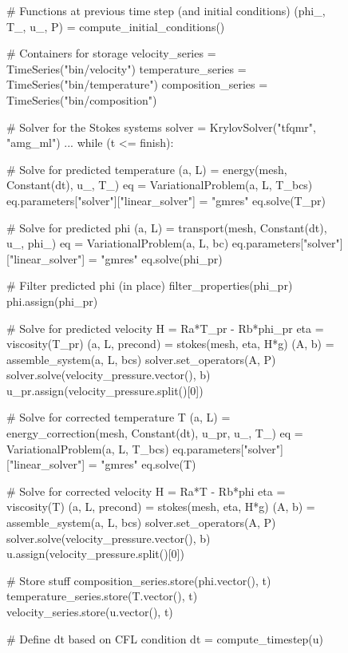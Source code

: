 \begin{figure}
    \begin{python}
# Functions at previous time step (and initial conditions)
(phi_, T_, u_, P) = compute_initial_conditions()

# Containers for storage
velocity_series = TimeSeries("bin/velocity")
temperature_series = TimeSeries("bin/temperature")
composition_series = TimeSeries("bin/composition")

# Solver for the Stokes systems
solver = KrylovSolver("tfqmr", "amg_ml")
...
while (t <= finish):

    # Solve for predicted temperature
    (a, L) = energy(mesh, Constant(dt), u_, T_)
    eq = VariationalProblem(a, L, T_bcs)
    eq.parameters["solver"]["linear_solver"] = "gmres"
    eq.solve(T_pr)

    # Solve for predicted phi
    (a, L) = transport(mesh, Constant(dt), u_, phi_)
    eq = VariationalProblem(a, L, bc)
    eq.parameters["solver"]["linear_solver"] = "gmres"
    eq.solve(phi_pr)

    # Filter predicted phi (in place)
    filter_properties(phi_pr)
    phi.assign(phi_pr)

    # Solve for predicted velocity
    H = Ra*T_pr - Rb*phi_pr
    eta = viscosity(T_pr)
    (a, L, precond) = stokes(mesh, eta, H*g)
    (A, b) = assemble_system(a, L, bcs)
    solver.set_operators(A, P)
    solver.solve(velocity_pressure.vector(), b)
    u_pr.assign(velocity_pressure.split()[0])

    # Solve for corrected temperature T
    (a, L) = energy_correction(mesh, Constant(dt), u_pr, u_, T_)
    eq = VariationalProblem(a, L, T_bcs)
    eq.parameters["solver"]["linear_solver"] = "gmres"
    eq.solve(T)

    # Solve for corrected velocity
    H = Ra*T - Rb*phi
    eta = viscosity(T)
    (a, L, precond) = stokes(mesh, eta, H*g)
    (A, b) = assemble_system(a, L, bcs)
    solver.set_operators(A, P)
    solver.solve(velocity_pressure.vector(), b)
    u.assign(velocity_pressure.split()[0])

    # Store stuff
    composition_series.store(phi.vector(), t)
    temperature_series.store(T.vector(), t)
    velocity_series.store(u.vector(), t)

    # Define dt based on CFL condition
    dt = compute_timestep(u)


\end{python}
\end{figure}
